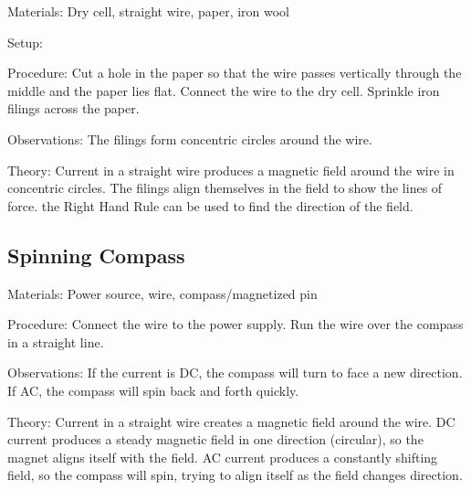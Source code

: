 \begin{multicols}{2}
\begin{description*}
\item[Materials:]{Dry cell, straight wire, paper, iron wool}
\item[Setup:]{}
\item[Procedure:]{Cut a hole in the paper so that the wire passes vertically through the middle and the paper lies flat. Connect the wire to the dry cell. Sprinkle iron filings across the paper.}
\item[Observations:]{The filings form concentric circles around the wire.}
\item[Theory:]{Current in a straight wire produces a magnetic field around the wire in concentric circles. The filings align themselves in the field to show the lines of force. the Right Hand Rule can be used to find the direction of the field.}
\end{description*}

\subsection{Spinning Compass}


\begin{description*}
\item[Materials:]{Power source, wire, compass/magnetized pin}
\item[Procedure:]{Connect the wire to the power supply. Run the wire over the compass in a straight line.}
\item[Observations:]{If the current is DC, the compass will turn to face a new direction. If AC, the compass will spin back and forth quickly.}
\item[Theory:]{Current in a straight wire creates a magnetic field around the wire. DC current produces a steady magnetic field in one direction (circular), so the magnet aligns itself with the field. AC current produces a constantly shifting field, so the compass will spin, trying to align itself as the field changes direction.}
\end{description*}


\end{multicols}
